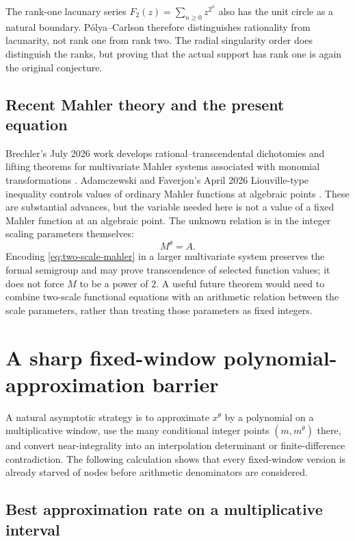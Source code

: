 \documentclass[11pt,oneside]{article}
\theoremstyle{definition}
\theoremstyle{remark}
\begin{document}
\begin{cautionbox}
The rank-one lacunary series $F_2(z)=\sum_{n\ge0}z^{2^n}$ also has the unit circle as a natural boundary.  P\'olya--Carlson therefore distinguishes rationality from lacunarity, not rank one from rank two.  The radial singularity order does distinguish the ranks, but proving that the actual support has rank one is again the original conjecture.
\end{cautionbox}

\subsection{Recent Mahler theory and the present equation}

Brechler's July 2026 work develops rational--transcendental dichotomies and lifting theorems for multivariate Mahler systems associated with monomial transformations \cite{Brechler2026}.  Adamczewski and Faverjon's April 2026 Liouville-type inequality controls values of ordinary Mahler functions at algebraic points \cite{AdamczewskiFaverjon2026}.  These are substantial advances, but the variable needed here is not a value of a fixed Mahler function at an algebraic point.  The unknown relation is in the integer scaling parameters themselves:
\[
  M^\theta=A.
\]
Encoding \eqref{eq:two-scale-mahler} in a larger multivariate system preserves the formal semigroup and may prove transcendence of selected function values; it does not force $M$ to be a power of $2$.  A useful future theorem would need to combine two-scale functional equations with an arithmetic relation between the scale parameters, rather than treating those parameters as fixed integers.

\section{A sharp fixed-window polynomial-approximation barrier}
\label{sec:approximation-barrier}

A natural asymptotic strategy is to approximate $x^\theta$ by a polynomial on a multiplicative window, use the many conditional integer points $(m,m^\theta)$ there, and convert near-integrality into an interpolation determinant or finite-difference contradiction.  The following calculation shows that every fixed-window version is already starved of nodes before arithmetic denominators are considered.

\subsection{Best approximation rate on a multiplicative interval}
\end{document}
